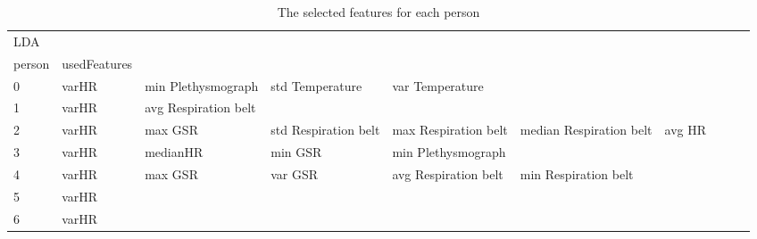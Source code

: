 \begin{landscape}
\begin{table}[]
\centering
\caption{The selected features for each person}
\begin{tabular}{l|llllllll}
LDA      &                         &                         &                         &                         &                         &                       &                         &                         &                         &         \\
person   & usedFeatures            &                         &                         &                         &                         &                       &                         &                         &                         &         \\
0        & varHR                   & min Plethysmograph      & std Temperature         & var Temperature         &                         &                       &                         &                         &                         &         \\
1        & varHR                   & avg Respiration belt    &                         &                         &                         &                       &                         &                         &                         &         \\
2        & varHR                   & max GSR                 & std Respiration belt    & max Respiration belt    & median Respiration belt & avg HR                &                         &                         &                         &         \\
3        & varHR                   & medianHR                & min GSR                 & min Plethysmograph      &                         &                       &                         &                         &                         &         \\
4        & varHR                   & max GSR                 & var GSR                 & avg Respiration belt    & min Respiration belt    &                       &                         &                         &                         &         \\
5        & varHR                   &                         &                         &                         &                         &                       &                         &                         &                         &         \\
6        & varHR                   &                         &                         &                         &                         &                       &                         &                         &                         &         \\

\end{tabular}
\end{table}
\end{landscape}

